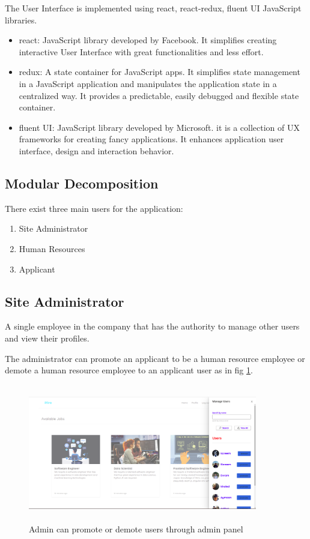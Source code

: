 The User Interface is implemented using react, react-redux, fluent UI JavaScript libraries.

\begin{itemize}
    \item react:  JavaScript library developed by Facebook. It simplifies creating interactive User Interface with great functionalities and less effort.
    \item redux: A state container for JavaScript apps. It simplifies state management in a JavaScript application and manipulates the application state in a centralized way. It provides a predictable, easily debugged and flexible state container.
    \item fluent UI: JavaScript library developed by Microsoft. it is a collection of UX frameworks for creating fancy applications. It enhances application user interface, design and interaction behavior.

\end{itemize}

\subsection{Modular Decomposition}
\label{sec:module_5_modular_decomposition}

There exist three main users for the application:
\begin{enumerate}
    \item Site Administrator 
    \item Human Resources 
    \item Applicant
\end{enumerate}

\subsection{Site Administrator}

A single employee in the company that has the authority to manage other users and view their profiles.

The administrator can promote an applicant to be a human resource employee or demote a human resource employee to an applicant user as in fig \ref{fig:admin_manage}.

\begin{figure}[h!]
\centering
\includegraphics[width=10cm, height=6cm, frame]{images/User Interface/admin_manage.png}
\caption{Admin can promote or demote users through admin panel}
\label{fig:admin_manage}
\end{figure}

